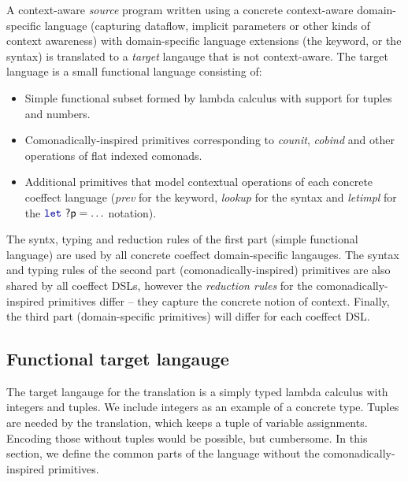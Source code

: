 A context-aware \emph{source} program written using a concrete context-aware domain-specific 
language (capturing dataflow, implicit parameters or other kinds of context awareness) with
domain-specific language extensions (the  keyword, or the  syntax)
is translated to a \emph{target} langauge that is not context-aware. The target language is
a small functional language consisting of:
%
\begin{itemize}
  \item Simple functional subset formed by lambda calculus with support for tuples and numbers.
  \item Comonadically-inspired primitives corresponding to \emph{counit}, \emph{cobind} and
    other operations of flat indexed comonads.
  \item Additional primitives that model contextual operations of each concrete coeffect language
    (\emph{prev} for the  keyword, \emph{lookup} for the  syntax and
    \emph{letimpl} for the $\kvd{let}~\ident{?p}=\ldots$ notation).
\end{itemize}
%
The syntx, typing and reduction rules of the first part (simple functional language) are used by 
all concrete coeffect domain-specific langauges. The syntax and typing rules of the second part 
(comonadically-inspired) primitives are also shared by all coeffect DSLs, however the \emph{reduction
rules} for the comonadically-inspired primitives differ -- they capture the concrete notion of
context. Finally, the third part (domain-specific primitives) will differ for each coeffect DSL.


\subsection{Functional target langauge}

The target langauge for the translation is a simply typed lambda calculus with integers and tuples.
We include integers as an example of a concrete type. Tuples are needed by the translation, which
keeps a tuple of variable assignments. Encoding those without tuples would be possible, but 
cumbersome. In this section, we define the common parts of the language without the 
comonadically-inspired primitives.

